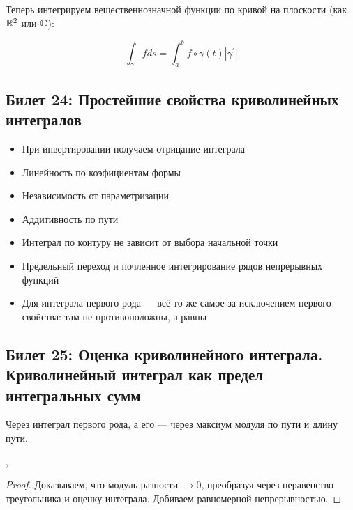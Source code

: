 \documentclass[12pt, a4paper, oneside]{memoir}
\begin{document}
\begin{definition} 
    
    Теперь интегрируем вещественнозначной функции по кривой на плоскости (как ${\mathbb{R}}^2$ или ${\mathbb{C}}$):

    \begin{equation}
        \int_\gamma f d s = \int_a^b f \circ \gamma(t) |\gamma^{\prime}|
    \end{equation}
\end{definition}



\subsection{Билет 24: Простейшие свойства криволинейных интегралов}

\begin{itemize}
    \item При инвертировании получаем отрицание интеграла
    \item Линейность по коэфициентам формы
    \item Независимость от параметризации
    \item Аддитивность по пути
    \item Интеграл по контуру не зависит от выбора начальной точки
    \item Предельный переход и почленное интегрирование рядов непрерывных функций
    \item Для интеграла первого рода — всё то же самое за исключением первого свойства: там не противоположны, а равны
\end{itemize}

\subsection{Билет 25: Оценка криволинейного интеграла. Криволинейный интеграл как предел интегральных сумм}

\begin{theorem}
    Через интеграл первого рода, а его — через максиум модуля по пути и длину пути.
\end{theorem}, 


\begin{theorem}
    \begin{proof}
        Доказываем, что модуль разности $→ 0$,
        преобразуя через неравенство треугольника и оценку интеграла.
        Добиваем равномерной непрерывностью.
    \end{proof}
\end{theorem}
\end{document}
